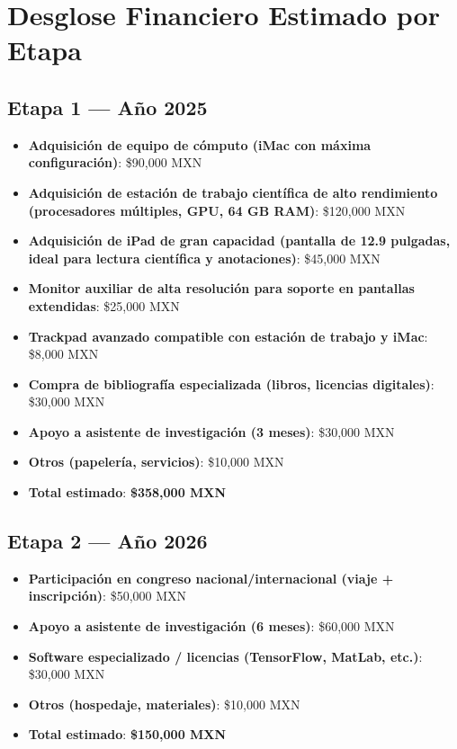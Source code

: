 \documentclass[12pt]{article}
\begin{document}
\section*{Desglose Financiero Estimado por Etapa}

\subsection*{Etapa 1 — Año 2025}
\begin{itemize}
  \item \textbf{Adquisición de equipo de cómputo (iMac con máxima configuración)}: \$90,000 MXN
  \item \textbf{Adquisición de estación de trabajo científica de alto rendimiento (procesadores múltiples, GPU, 64 GB RAM)}: \$120,000 MXN
  \item \textbf{Adquisición de iPad de gran capacidad (pantalla de 12.9 pulgadas, ideal para lectura científica y anotaciones)}: \$45,000 MXN
  \item \textbf{Monitor auxiliar de alta resolución para soporte en pantallas extendidas}: \$25,000 MXN
  \item \textbf{Trackpad avanzado compatible con estación de trabajo y iMac}: \$8,000 MXN
  \item \textbf{Compra de bibliografía especializada (libros, licencias digitales)}: \$30,000 MXN
  \item \textbf{Apoyo a asistente de investigación (3 meses)}: \$30,000 MXN
  \item \textbf{Otros (papelería, servicios)}: \$10,000 MXN
  \item \textbf{Total estimado}: \textbf{\$358,000 MXN}
\end{itemize}

\subsection*{Etapa 2 — Año 2026}
\begin{itemize}
  \item \textbf{Participación en congreso nacional/internacional (viaje + inscripción)}: \$50,000 MXN
  \item \textbf{Apoyo a asistente de investigación (6 meses)}: \$60,000 MXN
  \item \textbf{Software especializado / licencias (TensorFlow, MatLab, etc.)}: \$30,000 MXN
  \item \textbf{Otros (hospedaje, materiales)}: \$10,000 MXN
  \item \textbf{Total estimado}: \textbf{\$150,000 MXN}
\end{itemize}
\end{document}
